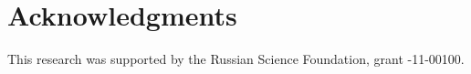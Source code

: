 \documentclass{ws-ijfcs}
\begin{document}


\section*{Acknowledgments}
This research was supported by the Russian Science Foundation, grant -11-00100.



  

\end{document}
